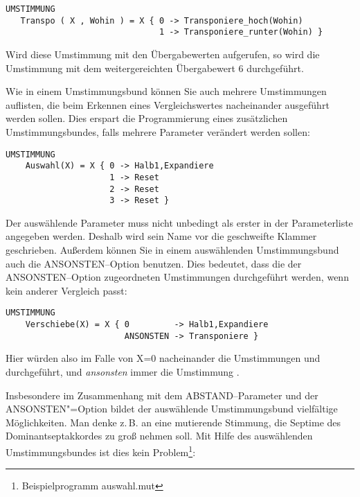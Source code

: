 \begin{verbatim}
UMSTIMMUNG
   Transpo ( X , Wohin ) = X { 0 -> Transponiere_hoch(Wohin)
                               1 -> Transponiere_runter(Wohin) }
\end{verbatim}

Wird diese Umstimmung mit den Übergabewerten  
aufgerufen, so wird die Umstimmung  mit dem 
weitergereichten Übergabewert 6 durchgeführt.

Wie in einem Umstimmungsbund können Sie auch mehrere Umstimmungen 
auflisten, die beim Erkennen eines Vergleichswertes nacheinander ausgeführt 
werden sollen. Dies erspart die Programmierung eines zusätzlichen 
Umstimmungsbundes, falls mehrere Parameter verändert werden sollen:

\begin{verbatim}
UMSTIMMUNG
    Auswahl(X) = X { 0 -> Halb1,Expandiere
                     1 -> Reset
                     2 -> Reset
                     3 -> Reset }
\end{verbatim}

Der auswählende Parameter muss nicht unbedingt als erster in der 
Parameterliste angegeben werden. Deshalb wird sein Name vor die 
geschweifte Klammer geschrieben. Außerdem können Sie in einem 
auswählenden Umstimmungsbund auch die ANSONSTEN--Option benutzen. 
Dies bedeutet, dass die der ANSONSTEN--Option zugeordneten Umstimmungen 
durchgeführt werden, wenn kein anderer Vergleich passt:

\begin{verbatim}
UMSTIMMUNG
    Verschiebe(X) = X { 0         -> Halb1,Expandiere
                        ANSONSTEN -> Transponiere }
\end{verbatim}

Hier würden also im Falle von X=0 nacheinander die Umstimmungen  
und  durchgeführt, und \emph{ansonsten} immer 
die Umstimmung .

Insbesondere im Zusammenhang mit dem ABSTAND--Parameter und der 
ANSONSTEN"=Option bildet der aus\-wähl\-en\-de Umstimmungsbund 
vielfältige Möglichkeiten. Man denke z.\,B. an eine mutierende Stimmung, 
die Septime des Dominantseptakkordes zu groß nehmen soll. 
Mit Hilfe des auswählenden Umstimmungsbundes ist 
dies kein Problem\footnote{Beispielprogramm auswahl.mut}:


